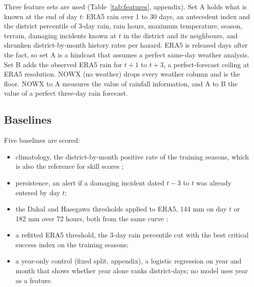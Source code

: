\documentclass[conference]{IEEEtran}
\begin{document}
Three feature sets are used (Table~\ref{tab:features}, appendix). Set A holds what is known at the end of day $t$: ERA5 rain over 1 to 30 days, an antecedent index and the district percentile of 3-day rain, rain hours, maximum temperature, season, terrain, damaging incidents known at $t$ in the district and its neighbours, and shrunken district-by-month history rates per hazard. ERA5 is released days after the fact, so set A is a hindcast that assumes a perfect same-day weather analysis. Set B adds the observed ERA5 rain for $t+1$ to $t+3$, a perfect-forecast ceiling at ERA5 resolution. NOWX (no weather) drops every weather column and is the floor. NOWX to A measures the value of rainfall information, and A to B the value of a perfect three-day rain forecast.

\subsection{Baselines}
Five baselines are scored:
\begin{itemize}
\item climatology, the district-by-month positive rate of the training seasons, which is also the reference for skill scores \cite{Hamill2006};
\item persistence, an alert if a damaging incident dated $t-3$ to $t$ was already entered by day $t$;
\item the Dahal and Hasegawa thresholds applied to ERA5, 144 mm on day $t$ or 182 mm over 72 hours, both from the same curve \cite{Dahal2008};
\item a refitted ERA5 threshold, the 3-day rain percentile cut with the best critical success index on the training seasons;
\item a year-only control (fixed split, appendix), a logistic regression on year and month that shows whether year alone ranks district-days; no model uses year as a feature.
\end{itemize}
\end{document}
